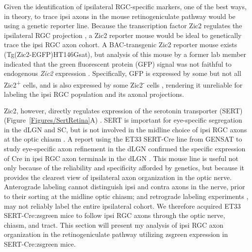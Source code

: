 \label{sec:SertCreResults}
Given the identification of ipsilateral RGC-specific markers, one of the best ways, in theory, to trace ipsi axons in the mouse retinogeniculate pathway would be using a genetic reporter line.
Because the transcription factor Zic2 regulates the ipsilateral RGC projection \cite{herrera2003zic2,williams2003ephrin}, a Zic2 reporter mouse would be ideal to genetically trace the ipsi RGC axon cohort.
A BAC-transgenic Zic2 reporter mouse exists (Tg(Zic2-EGFP)HT146Gsat), but analysis of this mouse by a former lab member indicated that the green fluorescent protein (GFP) signal was not faithful to endogenous \emph{Zic2} expression \cite{wang2013neuronal}.
Specifically, GFP is expressed by some but not all Zic2\textsuperscript{+} cells, and is also expressed by some Zic2\textsuperscript{-} cells \cite{wang2013neuronal}, rendering it unreliable for labeling the ipsi RGC population and its axonal projections.

Zic2, however, directly regulates expression of the serotonin transporter (SERT) (Figure~\ref{Figures/SertRetina}A) \cite{garcia2010zic2}.
SERT is important for eye-specific segregation in the dLGN and SC, but is not involved in the midline choice of ipsi RGC axons at the optic chiasm \cite{salichon2001excessive,upton1999excess,garcia2010zic2}.
A report using the ET33 SERT-Cre line from GENSAT to study eye-specific axon refinement in the dLGN confirmed the specific expression of Cre in ipsi RGC axon terminals in the dLGN \cite{koch2011pathway}.
This mouse line is useful not only because of the reliability and specificity afforded by genetics, but because it provides the clearest view of ipsilateral axon organization in the optic nerve.
Anterograde labeling cannot distinguish ipsi and contra axons in the nerve, prior to their sorting at the midline optic chiasm; and retrograde labeling experiments \cite{colello1990early}, may not reliably label the entire ipsilateral cohort.
We therefore acquired ET33 SERT-Cre:zsgreen mice to follow ipsi RGC axons through the optic nerve, chiasm, and tract.
This section will present my analysis of ipsi RGC axon organization in the retinogeniculate pathway utilizing zsgreen expression in SERT-Cre:zsgreen mice.

